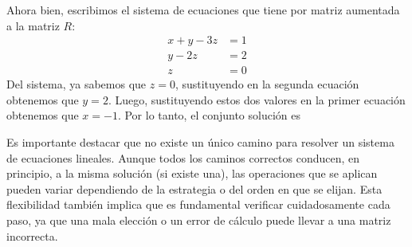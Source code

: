 \begin{examplebox}{}{}
    \begin{matrizn}
    \end{matrizn}
    Ahora bien, escribimos el sistema de ecuaciones que tiene por matriz aumentada a la matriz $R$:
    \begin{align*}
        x + y - 3z & = 1 \\
        y - 2z & = 2 \\
        z & = 0
    \end{align*}
    Del sistema, ya sabemos que $z = 0$, sustituyendo en la segunda ecuación obtenemos que $y = 2$. Luego, sustituyendo estos dos valores en la primer ecuación obtenemos que $x = -1$. Por lo tanto, el conjunto solución es
    \begin{matrizn}
    \end{matrizn}
\end{examplebox}

\newpage

Es importante destacar que no existe un único camino para resolver un sistema de ecuaciones lineales. Aunque todos los caminos correctos conducen, en principio, a la misma solución (si existe una), las operaciones que se aplican pueden variar dependiendo de la estrategia o del orden en que se elijan. Esta flexibilidad también implica que es fundamental verificar cuidadosamente cada paso, ya que una mala elección o un error de cálculo puede llevar a una matriz incorrecta.

